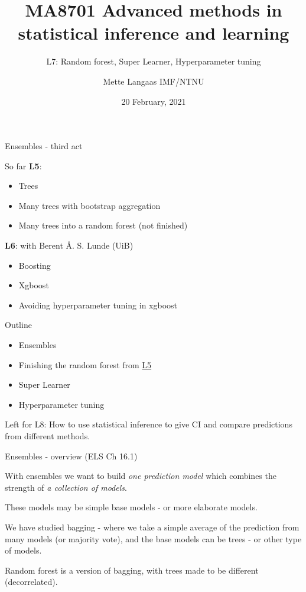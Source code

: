 \documentclass[
  ignorenonframetext,
]{beamer}
\title{MA8701 Advanced methods in statistical inference and learning}
\subtitle{L7: Random forest, Super Learner, Hyperparameter tuning}
\author{Mette Langaas IMF/NTNU}
\date{20 February, 2021}
\providecommand{\tightlist}{%
  \setlength{\itemsep}{0pt}\setlength{\parskip}{0pt}}
\begin{document}
\frame{\titlepage}

\begin{frame}{Ensembles - third act}
\protect\hypertarget{ensembles---third-act}{}
\begin{block}{So far}
\protect\hypertarget{so-far}{}
\textbf{L5}:

\begin{itemize}
\tightlist
\item
  Trees
\item
  Many trees with bootstrap aggregation
\item
  Many trees into a random forest (not finished)
\end{itemize}

\textbf{L6}: with Berent Å. S. Lunde (UiB)

\begin{itemize}
\tightlist
\item
  Boosting
\item
  Xgboost
\item
  Avoiding hyperparameter tuning in xgboost
\end{itemize}
\end{block}
\end{frame}

\begin{frame}
\begin{block}{Outline}
\protect\hypertarget{outline}{}
\begin{itemize}
\tightlist
\item
  Ensembles
\item
  Finishing the random forest from
  \href{http://htmlpreview.github.com/?https://github.com/mettelang/MA8701V2021/blob/main/Part2/L5.html}{L5}
\item
  Super Learner
\item
  Hyperparameter tuning
\end{itemize}

Left for L8: How to use statistical inference to give CI and compare
predictions from different methods.
\end{block}
\end{frame}

\begin{frame}{Ensembles - overview}
\protect\hypertarget{ensembles---overview}{}
(ELS Ch 16.1)

With ensembles we want to build \emph{one prediction model} which
combines the strength of \emph{a collection of models}.

These models may be simple base models - or more elaborate models.

We have studied bagging - where we take a simple average of the
prediction from many models (or majority vote), and the base models can
be trees - or other type of models.

Random forest is a version of bagging, with trees made to be different
(decorrelated).
\end{frame}
\end{document}
